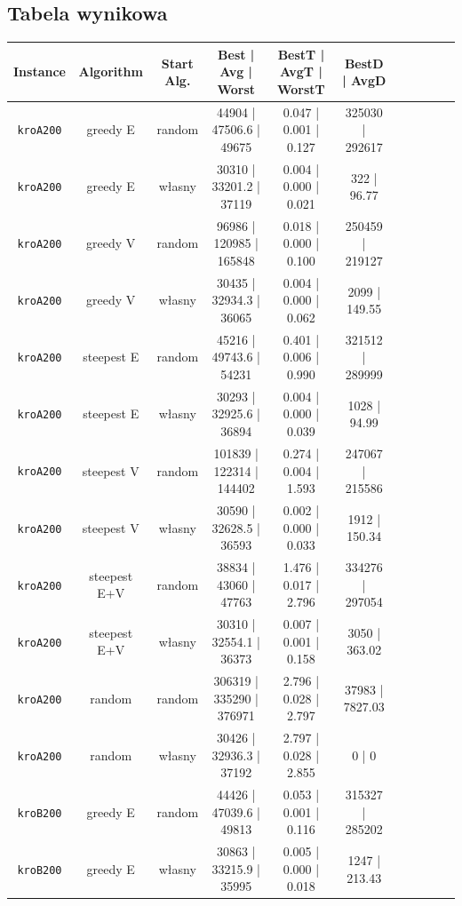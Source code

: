 \documentclass[11pt]{article}
\begin{document}
\subsection{Tabela wynikowa}\label{subsec:tabela-wynikowa}
\begin{table}[ht]
\centering
\begin{tabular}{|c|c|c||c|c|c||c|c|c||c|c|}
\hline
\textbf{Instance} & \textbf{Algorithm} & \textbf{Start Alg.} & \textbf{Best | Avg | Worst} & \textbf{BestT | AvgT | WorstT} & \textbf{BestD | AvgD} \\ \hline
\texttt{kroA200} & greedy E & random & 44904 | 47506.6 | 49675 & 0.047 | 0.001 | 0.127 & 325030 | 292617 \\ \hline
\texttt{kroA200} & greedy E & własny & 30310 | 33201.2 | 37119 & 0.004 | 0.000 | 0.021 & 322 | 96.77 \\ \hline
\texttt{kroA200} & greedy V & random & 96986 | 120985 | 165848 & 0.018 | 0.000 | 0.100 & 250459 | 219127 \\ \hline
\texttt{kroA200} & greedy V & własny & 30435 | 32934.3 | 36065 & 0.004 | 0.000 | 0.062 & 2099 | 149.55 \\ \hline
\texttt{kroA200} & steepest E & random & 45216 | 49743.6 | 54231 & 0.401 | 0.006 | 0.990 & 321512 | 289999 \\ \hline
\texttt{kroA200} & steepest E & własny & 30293 | 32925.6 | 36894 & 0.004 | 0.000 | 0.039 & 1028 | 94.99 \\ \hline
\texttt{kroA200} & steepest V & random & 101839 | 122314 | 144402 & 0.274 | 0.004 | 1.593 & 247067 | 215586 \\ \hline
\texttt{kroA200} & steepest V & własny & 30590 | 32628.5 | 36593 & 0.002 | 0.000 | 0.033 & 1912 | 150.34 \\ \hline
\texttt{kroA200} & steepest E+V & random & 38834 | 43060 | 47763 & 1.476 | 0.017 | 2.796 & 334276 | 297054 \\ \hline
\texttt{kroA200} & steepest E+V & własny & 30310 | 32554.1 | 36373 & 0.007 | 0.001 | 0.158 & 3050 | 363.02 \\ \hline
\texttt{kroA200} & random & random & 306319 | 335290 | 376971 & 2.796 | 0.028 | 2.797 & 37983 | 7827.03 \\ \hline
\texttt{kroA200} & random & własny & 30426 | 32936.3 | 37192 & 2.797 | 0.028 | 2.855 & 0 | 0 \\ \hline
\texttt{kroB200} & greedy E & random & 44426 | 47039.6 | 49813 & 0.053 | 0.001 | 0.116 & 315327 | 285202 \\ \hline
\texttt{kroB200} & greedy E & własny & 30863 | 33215.9 | 35995 & 0.005 | 0.000 | 0.018 & 1247 | 213.43 \\ \hline

\end{tabular}
\end{table}
\end{document}
